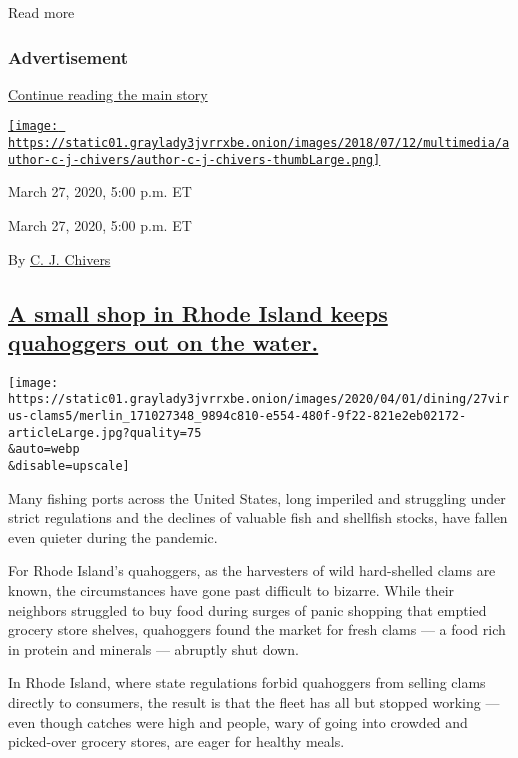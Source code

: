 Read more

\hypertarget{advertisement-1}{%
\subsubsection{Advertisement}\label{advertisement-1}}

\protect\hyperlink{after-dfp-ad-mid2}{Continue reading the main story}

\href{https://www.nytimes3xbfgragh.onion/by/c-j-chivers}{\texttt{[image: https://static01.graylady3jvrrxbe.onion/images/2018/07/12/multimedia/author-c-j-chivers/author-c-j-chivers-thumbLarge.png]}}

March 27, 2020, 5:00 p.m. ET

March 27, 2020, 5:00 p.m. ET

By \href{https://www.nytimes3xbfgragh.onion/by/c-j-chivers}{C. J.
Chivers}

\hypertarget{a-small-shop-in-rhode-island-keeps-quahoggers-out-on-the-water}{%
\subsection{\texorpdfstring{\protect\hyperlink{a-small-shop-in-rhode-island-keeps-quahoggers-out-on-the-water}{A
small shop in Rhode Island keeps quahoggers out on the
water.}}{A small shop in Rhode Island keeps quahoggers out on the water.}}\label{a-small-shop-in-rhode-island-keeps-quahoggers-out-on-the-water}}

\texttt{[image: https://static01.graylady3jvrrxbe.onion/images/2020/04/01/dining/27virus-clams5/merlin\_171027348\_9894c810-e554-480f-9f22-821e2eb02172-articleLarge.jpg?quality=75\\\&auto=webp\\\&disable=upscale]}

Many fishing ports across the United States, long imperiled and
struggling under strict regulations and the declines of valuable fish
and shellfish stocks, have fallen even quieter during the pandemic.

For Rhode Island's quahoggers, as the harvesters of wild hard-shelled
clams are known, the circumstances have gone past difficult to bizarre.
While their neighbors struggled to buy food during surges of panic
shopping that emptied grocery store shelves, quahoggers found the market
for fresh clams --- a food rich in protein and minerals --- abruptly
shut down.

In Rhode Island, where state regulations forbid quahoggers from selling
clams directly to consumers, the result is that the fleet has all but
stopped working --- even though catches were high and people, wary of
going into crowded and picked-over grocery stores, are eager for healthy
meals.

